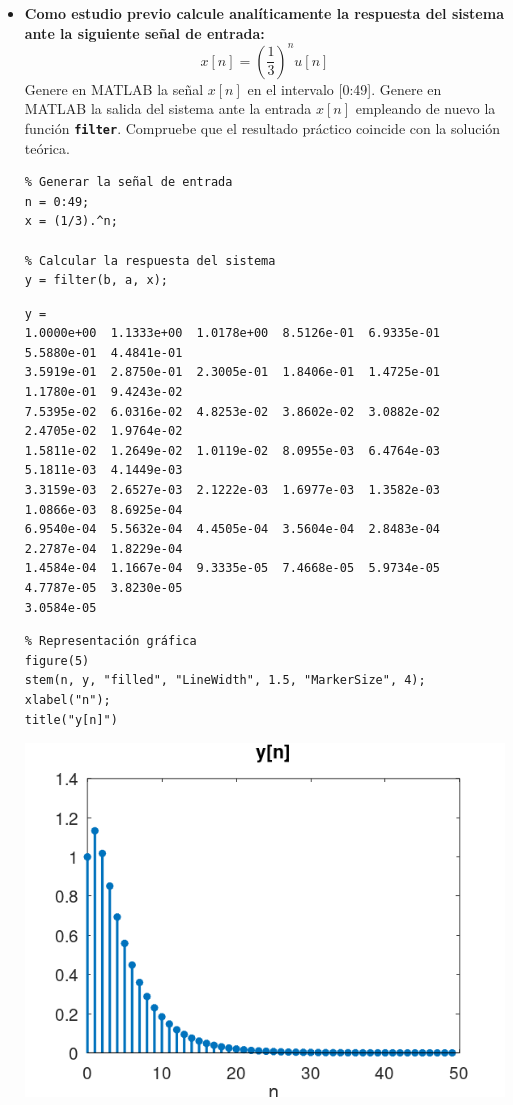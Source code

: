 \documentclass[12pt]{article}
\newcommand{\code}[1]{\texttt{\textbf{#1}}}
\begin{document}
\begin{itemize}
	\item \textbf{Como estudio previo calcule analíticamente la respuesta del sistema ante la siguiente señal de entrada:} \[ x[n]=\left(\dfrac{1}{3}\right)^nu[n] \] Genere en MATLAB la señal $x[n]$ en el intervalo [0:49]. Genere en MATLAB la salida del sistema ante la entrada $x[n]$ empleando de nuevo la función \code{filter}. Compruebe que el resultado práctico coincide con la solución teórica.
	
	\begin{lstlisting}
% Generar la señal de entrada
n = 0:49;
x = (1/3).^n;

% Calcular la respuesta del sistema
y = filter(b, a, x);
	\end{lstlisting}
	
\begin{verbatim}
y = 
1.0000e+00  1.1333e+00  1.0178e+00  8.5126e-01  6.9335e-01  5.5880e-01  4.4841e-01
3.5919e-01  2.8750e-01  2.3005e-01  1.8406e-01  1.4725e-01  1.1780e-01  9.4243e-02  
7.5395e-02  6.0316e-02  4.8253e-02  3.8602e-02  3.0882e-02  2.4705e-02  1.9764e-02  
1.5811e-02  1.2649e-02  1.0119e-02  8.0955e-03  6.4764e-03  5.1811e-03  4.1449e-03  
3.3159e-03  2.6527e-03  2.1222e-03  1.6977e-03  1.3582e-03  1.0866e-03  8.6925e-04  
6.9540e-04  5.5632e-04  4.4505e-04  3.5604e-04  2.8483e-04  2.2787e-04  1.8229e-04  
1.4584e-04  1.1667e-04  9.3335e-05  7.4668e-05  5.9734e-05  4.7787e-05  3.8230e-05  
3.0584e-05
\end{verbatim}
\pagebreak
\begin{lstlisting}
% Representación gráfica
figure(5)
stem(n, y, "filled", "LineWidth", 1.5, "MarkerSize", 4);
xlabel("n");
title("y[n]")
\end{lstlisting}
\begin{center}
	\includegraphics[width=0.7\linewidth]{Imágenes/Figura5}
\end{center}
	

\end{itemize}
\end{document}
